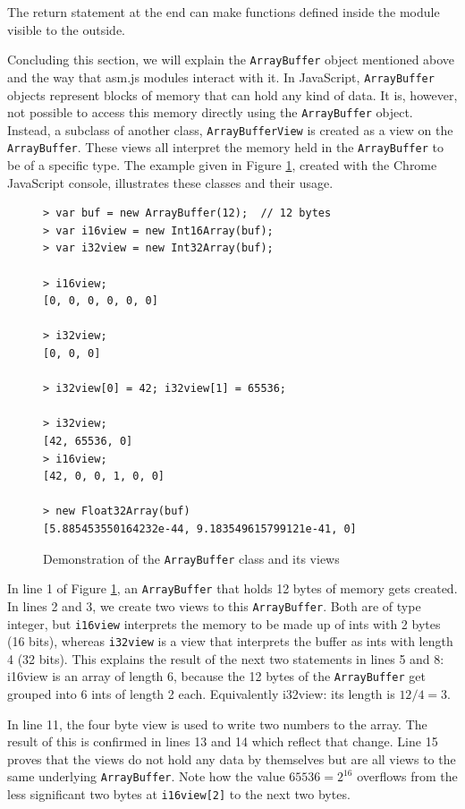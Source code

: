 \documentclass[11pt]{report}
\begin{document}
The return statement at the end can make functions defined inside the module visible to the outside.

Concluding this section, we will explain the \texttt{ArrayBuffer} object mentioned above and the way that asm.js modules interact with it. In JavaScript, \texttt{ArrayBuffer} objects represent blocks of memory that can hold any kind of data. It is, however, not possible to access this memory directly using the \texttt{ArrayBuffer} object. Instead, a subclass of another class, \texttt{ArrayBufferView} is created as a view on the \texttt{ArrayBuffer}. These views all interpret the memory held in the \texttt{ArrayBuffer} to be of a specific type. The example given in Figure \ref{arraybufferexample}, created with the Chrome JavaScript console, illustrates these classes and their usage.

\begin{figure}[ht]
\begin{lstlisting}
> var buf = new ArrayBuffer(12);  // 12 bytes
> var i16view = new Int16Array(buf);
> var i32view = new Int32Array(buf);

> i16view;
[0, 0, 0, 0, 0, 0]

> i32view;
[0, 0, 0]

> i32view[0] = 42; i32view[1] = 65536;

> i32view;
[42, 65536, 0]
> i16view;
[42, 0, 0, 1, 0, 0]

> new Float32Array(buf)
[5.885453550164232e-44, 9.183549615799121e-41, 0]
\end{lstlisting}
\caption{Demonstration of the \texttt{ArrayBuffer} class and its views}
\label{arraybufferexample}
\end{figure}

In line 1 of Figure \ref{arraybufferexample}, an \texttt{ArrayBuffer} that holds 12 bytes of memory gets created. In lines 2 and 3, we create two views to this \texttt{ArrayBuffer}. Both are of type integer, but \texttt{i16view} interprets the memory to be made up of ints with 2 bytes (16 bits), whereas \texttt{i32view} is a view that interprets the buffer as ints with length 4 (32 bits). This explains the result of the next two statements in lines 5 and 8: i16view is an array of length 6, because the 12 bytes of the \texttt{ArrayBuffer} get grouped into 6 ints of length 2 each. Equivalently i32view: its length is $12/4 = 3$.

In line 11, the four byte view is used to write two numbers to the array. The result of this is confirmed in lines 13 and 14 which reflect that change. Line 15 proves that the views do not hold any data by themselves but are all views to the same underlying \texttt{ArrayBuffer}. Note how the value $65536 = 2^{16}$ overflows from the less significant two bytes at \texttt{i16view[2]} to the next two bytes.
\end{document}
